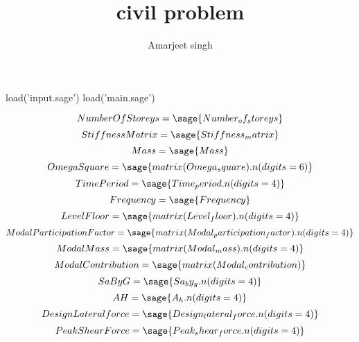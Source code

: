\documentclass[12pt]{report}
\title{civil problem}
\author{Amarjeet singh }
\begin{document}
\thispagestyle{plain}
	\begin{titlepage}
\maketitle
	\end{titlepage}
\begin{sagesilent}
load('input.sage')
load('main.sage')


\end{sagesilent}
\begin{equation}
	Number Of Storeys = \sage{Number_of_storeys}
\end{equation}
\begin{equation}
	Stiffness Matrix=\sage{Stiffness_matrix}
\end{equation}
\begin{equation}
	Mass =\sage{Mass}
\end{equation}
\begin{equation}
	Omega Square=\sage{matrix(Omega_square).n(digits=6)}
\end{equation}
\begin{equation}
	Time Period=\sage{Time_period.n(digits=4)}
\end{equation}
\begin{equation}
	Frequency=\sage{Frequency}
\end{equation}
\begin{equation}
	Level Floor=\sage{matrix(Level_floor).n(digits=4)}
\end{equation}
\begin{equation}
	Modal Participation Factor = \sage{matrix(Modal_participation_factor).n(digits=4)}
\end{equation}
\begin{equation}
	Modal Mass =\sage{matrix(Modal_mass).n(digits=4)}
\end{equation}
\begin{equation}
	Modal Contribution=\sage{matrix(Modal_contribution)}
\end{equation}
\begin{equation}
	Sa By G =\sage{Sa_by_g.n(digits=4)}
\end{equation}
\begin{equation}
	A H=\sage{A_h.n(digits=4)}
\end{equation}
\begin{equation}
	Design Lateral force=\sage{Design_lateral_force.n(digits=4)}
\end{equation}
\begin{equation}
	Peak Shear Force=\sage{Peak_shear_force.n(digits=4)}
\end{equation}
\end{document}
